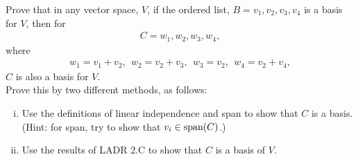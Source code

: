 \begin{question}\label{que:GeneralVectorSpaceNewBasisFromOld}
	\normalfont
	
	Prove that in any vector space, $V$, if the ordered list, $B=v_1, v_2, v_3, v_4$ \hspace{.1cm} is a basis for $V$, then for 
	\begin{align*}
		C= w_1, w_2, w_3, w_4 ,
	\end{align*}
	where
	\begin{align*}
		w_1=v_1+v_2,\ \  w_2=v_2+v_3,\ \  w_3=v_2,\ \  w_4=v_2 + v_4,
	\end{align*}
	$C$ is also a basis for $V$.  \\
	
	\noindent Prove this by two different methods, as follows:
	
	\begin{enumerate}[(i)]
		\item Use the definitions of linear independence and span to show that $C$ is a basis. (Hint: for span, try to show that $v_i\in\textnormal{span}(C)$.)
		
		\item Use the results of LADR 2.C to show that $C$ is a basis of $V$.
	\end{enumerate}
\end{question}

